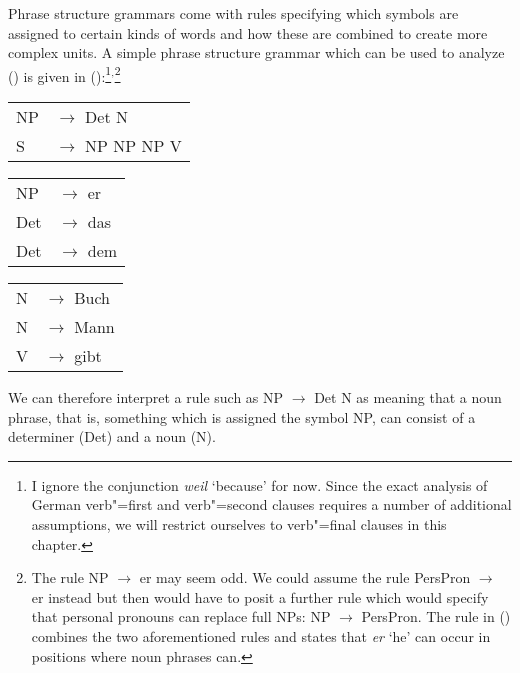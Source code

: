 Phrase structure grammars come with rules specifying which symbols are assigned to certain kinds of words and how these are combined to create more
complex units. A simple phrase structure grammar which can be used to analyze () is given in ():\footnote{%
	I ignore the conjunction \emph{weil} `because' for now. Since the exact analysis of
        German verb"=first and verb"=second clauses requires a number of additional assumptions, we will restrict ourselves to verb"=final clauses in this chapter.
}$^,$\footnote{\label{fn-np-pron-ps-rule}%
	The rule NP $\to$ er may seem odd. We could assume the rule PersPron $\to$ er instead but then would have to posit a further rule which
	would specify that personal pronouns can replace full NPs: NP $\to$ PersPron. The rule in () combines the two aforementioned rules and states
	that \emph{er} `he' can occur in positions where noun phrases can.
}
\ea
\label{bsp-grammatik-psg}
\begin{tabular}[t]{@{}l@{ }l}
{NP} & {$\to$ Det N}\\          
{S}  & {$\to$ NP NP NP V}
\end{tabular}\hspace{2cm}%
\begin{tabular}[t]{@{}l@{ }l}
{NP} & {$\to$ er}\\
{Det}  & {$\to$ das}\\
{Det}  & {$\to$ dem}\\
\end{tabular}\hspace{8mm}
\begin{tabular}[t]{@{}l@{ }l}
{N} & {$\to$ Buch}\\
{N} & {$\to$ Mann}\\
{V} & {$\to$ gibt}\\
\end{tabular}
\z
We can therefore interpret a rule such as NP $\to$\is{$\to$} Det N as meaning that a noun phrase, that is, something which is assigned the symbol NP, can consist
of a determiner (Det) and a noun (N).

